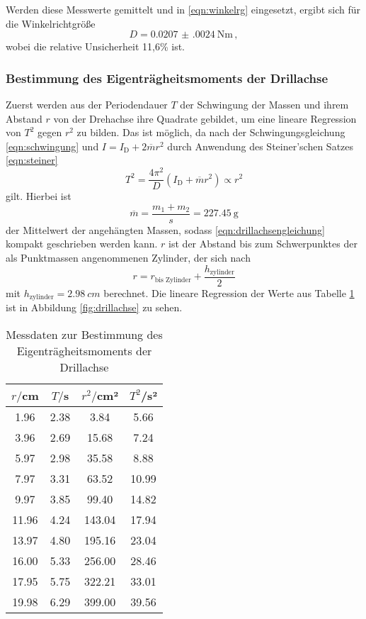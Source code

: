 Werden diese Messwerte gemittelt und in \eqref{eqn:winkelrg} eingesetzt, ergibt
sich für die Winkelrichtgröße
\begin{equation}
  D = \SI{0.0207(0024)}{\newton\meter}\,,
\end{equation}
wobei die relative Unsicherheit 11,6\% ist.
\subsubsection{Bestimmung des Eigenträgheitsmoments der Drillachse}
Zuerst werden aus der Periodendauer $T$ der Schwingung der Massen und ihrem
Abstand $r$ von der Drehachse ihre Quadrate gebildet, um eine lineare Regression
von $T^2$ gegen $r^2$ zu bilden. Das ist möglich, da nach der Schwingungsgleichung
\eqref{eqn:schwingung} und $I=I_{\text{D}}+2\overline{m}r^2$ durch Anwendung des
Steiner'schen Satzes \eqref{eqn:steiner}
\begin{equation}
  T^2 = \frac{4\pi^2}{D}(I_{\text{D}}+\overline{m}r^2)\propto r^2
  \label{eqn:drillachsengleichung}
\end{equation}
gilt. Hierbei ist
\begin{equation}
  \overline{m} = \frac{m_1+m_2}{s} =\SI{227.45}{\gram}
\end{equation}
der Mittelwert der angehängten Massen, sodass \eqref{eqn:drillachsengleichung}
kompakt geschrieben werden kann. $r$ ist der Abstand bis zum Schwerpunktes der
als Punktmassen angenommenen Zylinder, der sich nach
\begin{equation}
  r = r_{\text{bis Zylinder}}
      +\frac{h_{\text{zylinder}}}{2}
\end{equation}
mit $h_{\text{zylinder}} = \SI{2.98}{cm}$ berechnet.
Die lineare Regression der Werte aus Tabelle \ref{tab:drillachse} ist in
Abbildung \ref{fig:drillachse} zu sehen.

\begin{table}
\centering
\caption{Messdaten zur Bestimmung des Eigenträgheitsmoments der Drillachse}
\label{tab:drillachse}
\begin{tabular}{c c c c}
\toprule
$r/$cm & $T/$s & $r^2/$cm² & $T^2$/s² \\
\midrule
 1.96 & 2.38 &   3.84 &  5.66 \\
 3.96 & 2.69 &  15.68 &  7.24 \\
 5.97 & 2.98 &  35.58 &  8.88 \\
 7.97 & 3.31 &  63.52 & 10.99 \\
 9.97 & 3.85 &  99.40 & 14.82 \\
11.96 & 4.24 & 143.04 & 17.94 \\
13.97 & 4.80 & 195.16 & 23.04 \\
16.00 & 5.33 & 256.00 & 28.46 \\
17.95 & 5.75 & 322.21 & 33.01 \\
19.98 & 6.29 & 399.00 & 39.56 \\
\bottomrule
\end{tabular}
\end{table}

